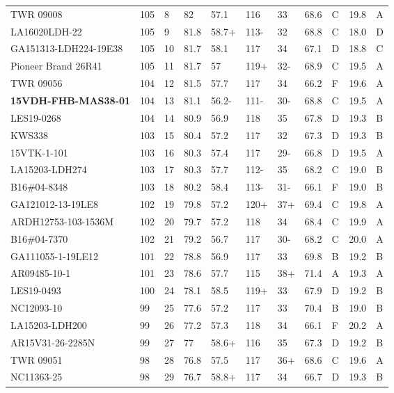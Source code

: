 \documentclass[12pt, letterpaper]{article}
\begin{document}
\begin{landscape}
\begin{ThreePartTable}
\begin{longtable}{lllllllllll}
  TWR 09008 & 105 &  8 & 82 & 57.1 & 116 & 33 & 68.6 & C & 19.8 & A \\ 
  LA16020LDH-22 & 105 &  9 & 81.8 & 58.7+ & 113- & 32 & 68.8 & C & 18.0 & D \\ 
  GA151313-LDH224-19E38 & 105 & 10 & 81.7 & 58.1 & 117 & 34 & 67.1 & D & 18.8 & C \\ 
  Pioneer Brand 26R41 & 105 & 11 & 81.7 & 57 & 119+ & 32- & 68.9 & C & 19.5 & A \\ 
  TWR 09056 & 104 & 12 & 81.5 & 57.7 & 117 & 34 & 66.2 & F & 19.6 & A \\ 
  \textbf{15VDH-FHB-MAS38-01} & 104 & 13 & 81.1 & 56.2- & 111- & 30- & 68.8 & C & 19.5 & A \\ 
  LES19-0268 & 104 & 14 & 80.9 & 56.9 & 118 & 35 & 67.8 & D & 19.3 & B \\ 
  KWS338 & 103 & 15 & 80.4 & 57.2 & 117 & 32 & 67.3 & D & 19.3 & B \\ 
  15VTK-1-101 & 103 & 16 & 80.3 & 57.4 & 117 & 29- & 66.8 & D & 19.5 & A \\ 
  LA15203-LDH274 & 103 & 17 & 80.3 & 57.7 & 112- & 35 & 68.2 & C & 19.0 & B \\ 
  B16\#04-8348 & 103 & 18 & 80.2 & 58.4 & 113- & 31- & 66.1 & F & 19.0 & B \\ 
  GA121012-13-19LE8 & 102 & 19 & 79.8 & 57.2 & 120+ & 37+ & 69.4 & C & 19.8 & A \\ 
  ARDH12753-103-1536M & 102 & 20 & 79.7 & 57.2 & 118 & 34 & 68.4 & C & 19.9 & A \\ 
  B16\#04-7370 & 102 & 21 & 79.2 & 56.7 & 117 & 30- & 68.2 & C & 20.0 & A \\ 
  GA111055-1-19LE12 & 101 & 22 & 78.8 & 56.9 & 117 & 33 & 69.8 & B & 19.2 & B \\ 
  AR09485-10-1 & 101 & 23 & 78.6 & 57.7 & 115 & 38+ & 71.4 & A & 19.3 & A \\ 
  LES19-0493 & 100 & 24 & 78.1 & 58.5 & 119+ & 33 & 67.9 & D & 19.2 & B \\ 
  NC12093-10 &  99 & 25 & 77.6 & 57.2 & 117 & 33 & 70.4 & B & 19.0 & B \\ 
  LA15203-LDH200 &  99 & 26 & 77.2 & 57.3 & 118 & 34 & 66.1 & F & 20.2 & A \\ 
  AR15V31-26-2285N &  99 & 27 & 77 & 58.6+ & 116 & 35 & 67.3 & D & 19.2 & B \\ 
  TWR 09051 &  98 & 28 & 76.8 & 57.5 & 117 & 36+ & 68.6 & C & 19.6 & A \\ 
  NC11363-25 &  98 & 29 & 76.7 & 58.8+ & 117 & 34 & 66.7 & D & 19.3 & B \\ 

\end{longtable}
\end{ThreePartTable}
\end{landscape}
\end{document}
